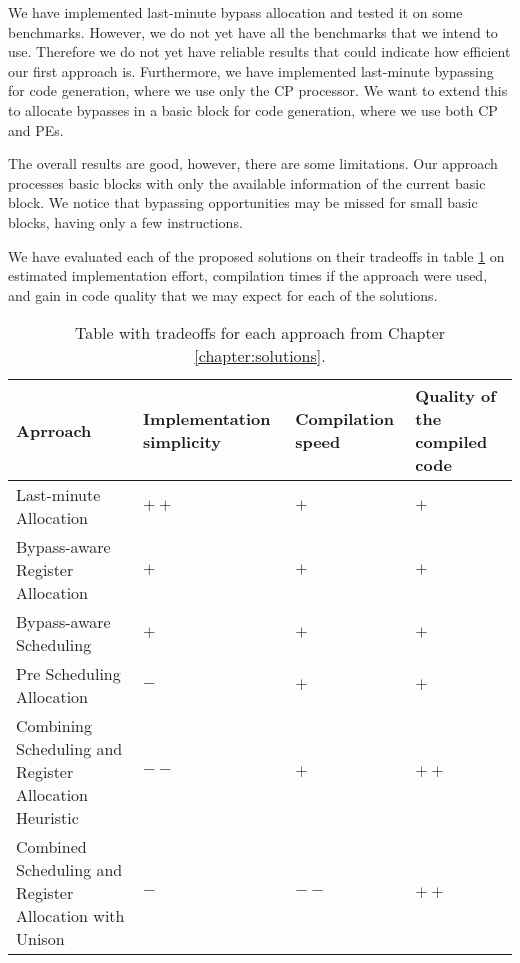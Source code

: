 We have implemented last-minute bypass allocation and tested it on some benchmarks. However, we do not yet have all the benchmarks that we intend to use. Therefore we do not yet have reliable results that could indicate how efficient our first approach is. Furthermore, we have implemented last-minute bypassing for code generation, where we use only the CP processor. We want to extend this to allocate bypasses in a basic block for code generation, where we use both CP and PEs.

The overall results are good, however, there are some limitations. Our approach processes basic blocks with only the available information of the current basic block. We notice that bypassing opportunities may be missed for small basic blocks, having only a few instructions. %


We have evaluated each of the proposed solutions on their tradeoffs in table \ref{table:tradeoffs} on estimated implementation effort, compilation times if the approach were used, and gain in code quality that we may expect for each of the solutions. 

\begin{table}[h]
\caption{Table with tradeoffs for each approach from Chapter \ref{chapter:solutions}.}
\begin{center}
\begin{tabular}{@{}p{}p{}p{}p{}@{}}
\toprule
\textbf{Aprroach} 		& \textbf{Implementation simplicity} & \textbf{Compilation speed} & \textbf{Quality of the compiled code} \\ \hline
Last-minute Allocation  	& $++$ & $+$ & $+$ \\
Bypass-aware Register Allocation & $+$ & $+$ & $+$ \\
Bypass-aware Scheduling & $+$ & $+$ & $+$ \\
Pre Scheduling Allocation & $-$ & $+$ & $+$ \\
Combining Scheduling and Register Allocation Heuristic & $--$ & $+$ & $++$ \\
Combined Scheduling and Register Allocation with Unison & $-$ & $--$ & $++$ \\
\bottomrule
\end{tabular}
\end{center}
\label{table:tradeoffs}
\end{table}%